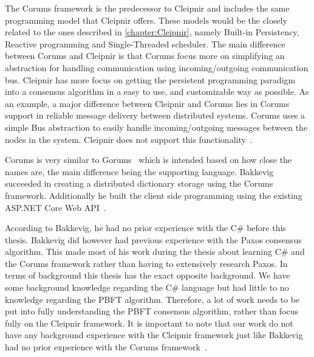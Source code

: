 The Corums framework is the predecessor to Cleipnir and includes the same programming model that Cleipnir offers. These models would be the closely related to the ones described in \autoref{chapter:Cleipnir}, namely Built-in Persistency, Reactive programming and Single-Threaded scheduler. 
The main difference between Corums and Cleipnir is that Corums focus more on simplifying an abstraction for handling communication using incoming/outgoing communication bus. Cleipnir has more focus on getting the persistent programming paradigm into a consensus algorithm in a easy to use, and customizable way as possible. As an example, a major difference between Cleipnir and Corums lies in Corums support in reliable message delivery between distributed systems. Corums uses a simple Bus abstraction to easily handle incoming/outgoing messages between the nodes in the system. Cleipnir does not support this functionality~\cites[p.~6-7]{PAPER:PaxosCleipnir}{DOC:Cleipnir}.

Corums is very similar to Gorums~\cites[p.~2]{WEB:Gorums}[p.~22]{PAPER:EivindPaper} which is intended based on how close the names are, the main difference being the supporting language. 
Bakkevig succeeded in creating a distributed dictionary storage using the Corums framework. Additionally he built the client side programming using the existing ASP.NET Core Web API~\cite{WEB:ASPNetCoreAPI}. 

According to Bakkevig, he had no prior experience with the C\# before this thesis. Bakkevig did however had previous experience with the Paxos consensus algorithm. This made most of his work during the thesis about learning C\# and the Corums framework rather than having to extensively research Paxos. In terms of background this thesis has the exact opposite background. We have some background knowledge regarding the C\# language but had little to no knowledge regarding the PBFT algorithm. Therefore, a lot of work needs to be put into fully understanding the PBFT consensus algorithm, rather than focus fully on the Cleipnir framework. It is important to note that our work do not have any background experience with the Cleipnir framework just like Bakkevig had no prior experience with the Corums framework~\cite[p.~8]{PAPER:EivindPaper}.
